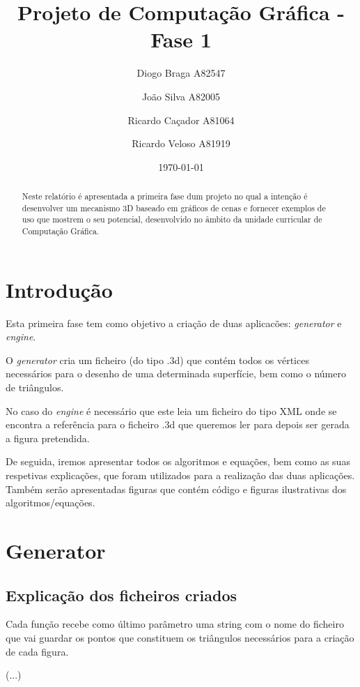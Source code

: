 \documentclass[a4paper]{article}
\title{Projeto de Computação Gráfica - Fase 1}
\author{Diogo Braga A82547 \and João Silva A82005 \and Ricardo Caçador A81064
\and Ricardo Veloso A81919}
\date{\today}
\begin{document}
\maketitle

\begin{abstract}
Neste relatório é apresentada a primeira fase dum projeto no qual a intenção é desenvolver um mecanismo 3D baseado em gráficos de cenas e fornecer exemplos de uso que mostrem o seu potencial, desenvolvido no âmbito da unidade curricular de Computação Gráfica.
\end{abstract}

\tableofcontents

\newpage


\section{Introdução}
\label{sec:intro}

Esta primeira fase tem como objetivo a criação de duas aplicacões: \textit{generator} e \textit{engine}.

O \textit{generator} cria um ficheiro (do tipo .3d) que contém todos os vértices necessários para o desenho de uma determinada superfície, bem como o número de triângulos.

No caso do \textit{engine} é necessário que este leia um ficheiro do tipo XML onde se encontra a referência para o ficheiro .3d que queremos ler para depois ser gerada a figura pretendida.

De seguida, iremos apresentar todos os algoritmos e equações, bem como as suas respetivas explicações, que foram utilizados para a realização das duas aplicações. Também serão apresentadas figuras que contém código e figuras ilustrativas dos algoritmos/equações.

\section{Generator}
\label{sec:generator}

\subsection{Explicação dos ficheiros criados}
\label{sec:ficheiros}

Cada função recebe como último parâmetro uma string com o nome do ficheiro que vai guardar os pontos que constituem os triângulos necessários para a criação de cada figura.

(...)
\end{document}
